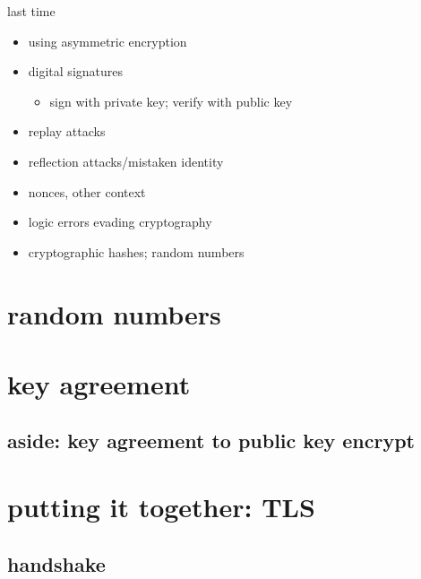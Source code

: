 \date{}
\title{}
\date{}
\usepackage{pgfplots}
\pgfplotsset{compat=1.16}

\begin{frame}
    \titlepage
\end{frame}

\begin{frame}{last time}
    \begin{itemize}
    \item using asymmetric encryption
    \item digital signatures
        \begin{itemize}
        \item sign with private key; verify with public key
        \end{itemize}
    \item replay attacks
    \item reflection attacks/mistaken identity
    \item nonces, other context
    \item logic errors evading cryptography
    \item cryptographic hashes; random numbers
    \end{itemize}
\end{frame}

\section{random numbers}


\section{key agreement}



\subsection{aside: key agreement to public key encrypt}


\section{putting it together: TLS}

\subsection{handshake}


